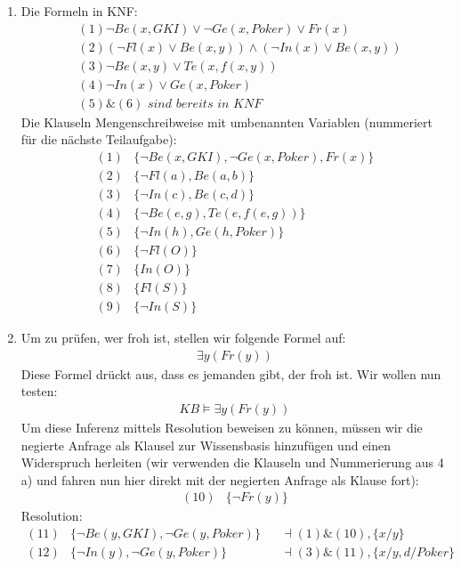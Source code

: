 \documentclass[a4paper,10pt]{article}
\begin{document}
\begin{enumerate}[~~a)]
    \item
Die Formeln in KNF:
\begin{align*}
&(1) \lnot Be(x,GKI) \lor \lnot Ge(x, Poker) \lor Fr(x)\\
&(2) (\lnot Fl(x) \lor Be(x,y)) \land (\lnot In(x) \lor Be(x,y))\\
&(3) \lnot Be(x,y) \lor Te(x,f(x,y))\\
&(4) \lnot In(x) \lor Ge(x, Poker)\\
&(5) \& (6) \textit{ sind bereits in KNF}
\end{align*}
Die Klauseln Mengenschreibweise mit umbenannten Variablen (nummeriert für die nächste Teilaufgabe):
\begin{align*}
(1) &\{\lnot Be(x, GKI), \lnot Ge(x,Poker) , Fr(x) \}\\
(2) &\{\lnot Fl(a), Be(a,b)\}\\
(3) &\{ \lnot In(c), Be(c,d)\}\\
(4) &\{\lnot Be(e,g), Te(e,f(e,g))\}\\
(5) &\{\lnot In(h), Ge(h, Poker)\}\\
(6) &\{\lnot Fl(O)\}\\
(7) &\{In(O)\}\\
(8) &\{Fl(S)\}\\
(9) &\{\lnot In(S)\}
\end{align*}
    \item
Um zu prüfen, wer froh ist, stellen wir folgende Formel auf:
\begin{align*}
\exists y(Fr(y))
\end{align*}
Diese Formel drückt aus, dass es jemanden gibt, der froh ist. Wir wollen nun testen:
\begin{align*}
KB \vDash \exists y (Fr(y))
\end{align*}
Um diese Inferenz mittels Resolution beweisen zu können, müssen wir die negierte Anfrage als Klausel zur Wissensbasis hinzufügen und einen Widerspruch herleiten (wir verwenden die Klauseln und Nummerierung aus 4 a) und fahren nun hier direkt mit der negierten Anfrage als Klause fort):
\begin{align*}
(10) &\{\lnot Fr(y)\}
\end{align*}
Resolution:
\begin{align*}
(11) &\{\lnot Be(y, GKI), \lnot Ge(y,Poker)\} &&\dashv (1) \& (10), \{x/y\}\\
(12) &\{\lnot In(y),\lnot Ge(y,Poker)\} &&\dashv (3) \& (11), \{x/y,d/Poker\}\\

\end{align*}
\end{enumerate}
\end{document}
